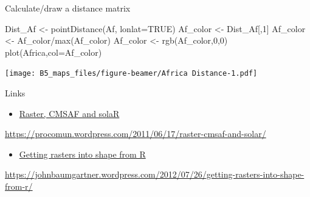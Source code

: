 \documentclass[
  10pt,
  ignorenonframetext,
]{beamer}
\newenvironment{Shaded}{\begin{snugshade}}{\end{snugshade}}
\newcommand{\DataTypeTok}[1]{\textcolor[rgb]{0.87,0.87,0.75}{#1}}
\newcommand{\DecValTok}[1]{\textcolor[rgb]{0.86,0.86,0.80}{#1}}
\newcommand{\KeywordTok}[1]{\textcolor[rgb]{0.94,0.87,0.69}{#1}}
\newcommand{\NormalTok}[1]{\textcolor[rgb]{0.80,0.80,0.80}{#1}}
\newcommand{\OperatorTok}[1]{\textcolor[rgb]{0.94,0.94,0.82}{#1}}
\newcommand{\OtherTok}[1]{\textcolor[rgb]{0.94,0.94,0.56}{#1}}
\newcommand{\StringTok}[1]{\textcolor[rgb]{0.80,0.58,0.58}{#1}}
\providecommand{\tightlist}{%
  \setlength{\itemsep}{0pt}\setlength{\parskip}{0pt}}
\begin{document}
\begin{frame}[fragile]{Calculate/draw a distance matrix}
\protect\hypertarget{calculatedraw-a-distance-matrix}{}

\begin{Shaded}
\begin{Highlighting}[]
\NormalTok{Dist_Af <-}\StringTok{ }\KeywordTok{pointDistance}\NormalTok{(Af, }\DataTypeTok{lonlat=}\OtherTok{TRUE}\NormalTok{)}
\NormalTok{Af_color <-}\StringTok{ }\NormalTok{Dist_Af[,}\DecValTok{1}\NormalTok{]}
\NormalTok{Af_color <-}\StringTok{ }\NormalTok{Af_color}\OperatorTok{/}\KeywordTok{max}\NormalTok{(Af_color)}
\NormalTok{Af_color <-}\StringTok{ }\KeywordTok{rgb}\NormalTok{(Af_color,}\DecValTok{0}\NormalTok{,}\DecValTok{0}\NormalTok{)}
\KeywordTok{plot}\NormalTok{(Africa,}\DataTypeTok{col=}\NormalTok{Af_color)}
\end{Highlighting}
\end{Shaded}

\texttt{[image: B5\_maps\_files/figure-beamer/Africa Distance-1.pdf]}

\end{frame}

\begin{frame}{Links}
\protect\hypertarget{links}{}

\begin{itemize}
\tightlist
\item
  \href{https://procomun.wordpress.com/2011/06/17/raster-cmsaf-and-solar/}{Raster,
  CMSAF and solaR}
\end{itemize}

\url{https://procomun.wordpress.com/2011/06/17/raster-cmsaf-and-solar/}

\begin{itemize}
\tightlist
\item
  \href{https://johnbaumgartner.wordpress.com/2012/07/26/getting-rasters-into-shape-from-r/}{Getting
  rasters into shape from R}
\end{itemize}

\url{https://johnbaumgartner.wordpress.com/2012/07/26/getting-rasters-into-shape-from-r/}

\end{frame}
\end{document}

